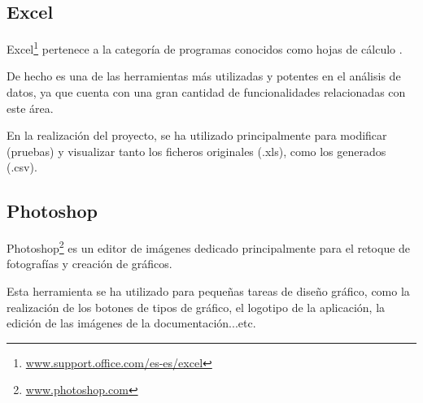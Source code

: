 \subsection{Excel}\label{excel}
Excel\footnote{\href{https://support.office.com/es-es/excel}{www.support.office.com/es-es/excel}} pertenece a la categoría de programas conocidos como hojas de cálculo \cite{excel}.

De hecho es una de las herramientas más utilizadas y potentes en el análisis de datos, ya que cuenta con una gran cantidad de funcionalidades relacionadas con este área.

En la realización del proyecto, se ha utilizado principalmente para modificar (pruebas) y visualizar tanto los ficheros originales (.xls), como los generados (.csv). 


\subsection{Photoshop}\label{photoshop}
Photoshop\footnote{\href{https://www.photoshop.com/}{www.photoshop.com}} es un editor de imágenes dedicado principalmente para el retoque de fotografías y creación de gráficos. 

Esta herramienta se ha utilizado para pequeñas tareas de diseño gráfico, como la realización de los botones de tipos de gráfico, el logotipo de la aplicación, la edición de las imágenes de la documentación...etc.